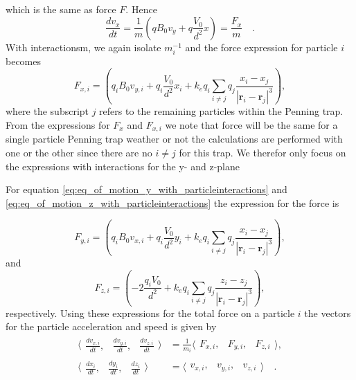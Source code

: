 \documentclass[../main_proj3.tex]{subfiles}
\begin{document}
which is the same as force $F$. Hence 
\begin{equation}
\frac{d v_x}{dt} = \frac{1}{m} \left( 
qB_0 v_y + q \frac{V_0}{d^{2}} x
\right) = \frac {F_x}{m}\quad.
\end{equation}
With interactionsm, we again isolate $m_i^{-1}$ and the force expression for particle $i$ becomes 
\begin{equation*}
F_{x,i} = \left( 
q_iB_0 v_{y,i}  + q_i \frac{V_0}{d^{2}} x_i + k_e q_i \sum_{i\neq j} q_j \frac{x_i-x_j}{|\mathbf{r}_i - \mathbf{r}_j|^3} 
\right),
\end{equation*}
where the subscript $j$ refers to the remaining particles within the Penning trap. From the expressions for $F_x$ and $F_{x,i}$ we note that force will be the same for a single particle Penning trap weather or not the calculations are performed with one or the other since there are no $i\neq j$ for this trap. We therefor only focus on the expressions with interactions for the y- and z-plane

For equation \eqref{eq:eq_of_motion_y_with_particleinteractions} and \eqref{eq:eq_of_motion_z_with_particleinteractions} the expression for the force is 

\begin{equation*}
    F_{y,i} = \left( 
q_iB_0 v_{x,i}  + q_i \frac{V_0}{d^{2}} y_i + k_e q_i \sum_{i\neq j} q_j \frac{x_i-x_j}{|\mathbf{r}_i - \mathbf{r}_j|^3} 
\right), 
\end{equation*}
and 
\begin{equation*}
    F_{z,i} = \left(-2 \frac{q_iV_0}{d^{2}} + k_e q_i \sum\limits_{i\neq j} q_j \frac{z_i-z_j}{|\mathbf{r}_i - \mathbf{r}_j|^{3}}
    \right),
\end{equation*}
respectively. Using these expressions for the total force on a particle $i$ the vectors for the particle acceleration and speed is given by 
\begin{equation}
\label{eq:coupled_equations}
\begin{split}
    \langle\begin{matrix}
        \frac{dv_{x,i}}{dt}, & \frac{dv_{y,i}}{dt}, & \frac{dv_{z,i}}{dt}
    \end{matrix}\rangle &=
    \frac{1}{m_i}
    \langle\begin{matrix}
        F_{x,i}, & F_{y,i}, & F_{z,i}
    \end{matrix}\rangle , \\
    \langle\begin{matrix}
        \frac{dx_i}{dt}, & \frac{dy_i}{dt}, & \frac{dz_i}{dt}
    \end{matrix}\rangle &=
    \langle\begin{matrix}
        v_{x,i}, & v_{y,i}, & v_{z,i}
    \end{matrix}\rangle \quad.
\end{split}
\end{equation}
\end{document}
